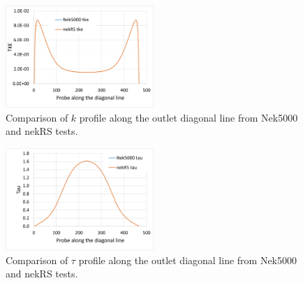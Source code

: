 \begin{figure}[!ht]
\centering
\includegraphics[width=0.5\textwidth]{./figures/tke_verification_bundle2x2.png}
\caption{Comparison of $k$ profile along the outlet diagonal line from Nek5000 and nekRS tests. }
\label{fig:tkeplot}
\end{figure}

\begin{figure}[!ht]
\centering
\includegraphics[width=0.5\textwidth]{./figures/tau_verification_bundle2x2.png}
\caption{Comparison of $\tau$ profile along the outlet diagonal line from Nek5000 and nekRS tests. }
\label{fig:tauplot}
\end{figure}